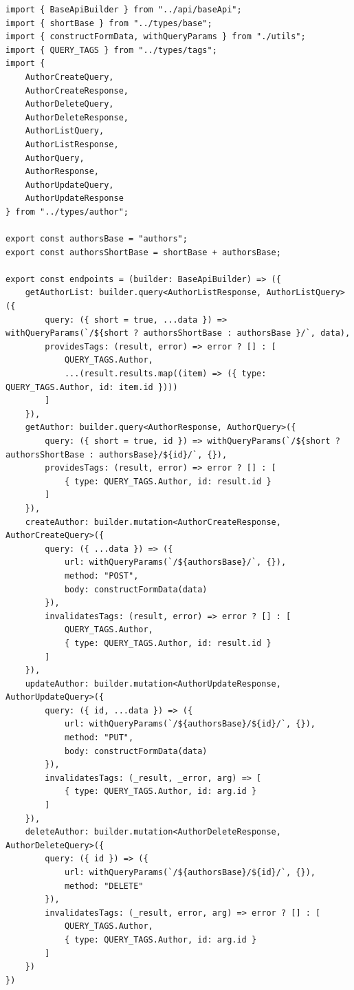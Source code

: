 \documentclass[a4paper,14pt]{extarticle}
\begin{document}
\begin{verbatim}
import { BaseApiBuilder } from "../api/baseApi";
import { shortBase } from "../types/base";
import { constructFormData, withQueryParams } from "./utils";
import { QUERY_TAGS } from "../types/tags";
import {
    AuthorCreateQuery,
    AuthorCreateResponse,
    AuthorDeleteQuery,
    AuthorDeleteResponse,
    AuthorListQuery,
    AuthorListResponse,
    AuthorQuery,
    AuthorResponse,
    AuthorUpdateQuery,
    AuthorUpdateResponse
} from "../types/author";

export const authorsBase = "authors";
export const authorsShortBase = shortBase + authorsBase;

export const endpoints = (builder: BaseApiBuilder) => ({
    getAuthorList: builder.query<AuthorListResponse, AuthorListQuery>({
        query: ({ short = true, ...data }) => withQueryParams(`/${short ? authorsShortBase : authorsBase }/`, data),
        providesTags: (result, error) => error ? [] : [
            QUERY_TAGS.Author,
            ...(result.results.map((item) => ({ type: QUERY_TAGS.Author, id: item.id })))
        ]
    }),
    getAuthor: builder.query<AuthorResponse, AuthorQuery>({
        query: ({ short = true, id }) => withQueryParams(`/${short ? authorsShortBase : authorsBase}/${id}/`, {}),
        providesTags: (result, error) => error ? [] : [
            { type: QUERY_TAGS.Author, id: result.id }
        ]
    }),
    createAuthor: builder.mutation<AuthorCreateResponse, AuthorCreateQuery>({
        query: ({ ...data }) => ({
            url: withQueryParams(`/${authorsBase}/`, {}),
            method: "POST",
            body: constructFormData(data)
        }),
        invalidatesTags: (result, error) => error ? [] : [
            QUERY_TAGS.Author,
            { type: QUERY_TAGS.Author, id: result.id }
        ]
    }),
    updateAuthor: builder.mutation<AuthorUpdateResponse, AuthorUpdateQuery>({
        query: ({ id, ...data }) => ({
            url: withQueryParams(`/${authorsBase}/${id}/`, {}),
            method: "PUT",
            body: constructFormData(data)
        }),
        invalidatesTags: (_result, _error, arg) => [
            { type: QUERY_TAGS.Author, id: arg.id }
        ]
    }),
    deleteAuthor: builder.mutation<AuthorDeleteResponse, AuthorDeleteQuery>({
        query: ({ id }) => ({
            url: withQueryParams(`/${authorsBase}/${id}/`, {}),
            method: "DELETE"
        }),
        invalidatesTags: (_result, error, arg) => error ? [] : [
            QUERY_TAGS.Author,
            { type: QUERY_TAGS.Author, id: arg.id }
        ]
    })
})
\end{verbatim}
\end{document}
